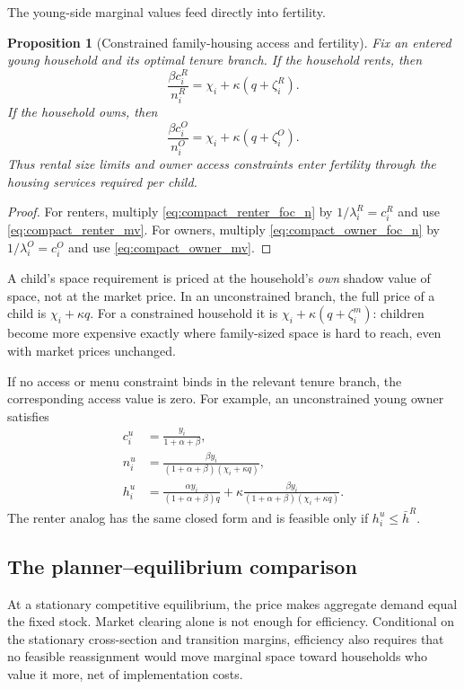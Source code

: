 \documentclass[11pt]{article}
\newtheorem{proposition}{Proposition}
\newcommand{\1}{\mathbf 1}
\begin{document}
The young-side marginal values feed directly into fertility.

\begin{proposition}[Constrained family-housing access and fertility]
Fix an entered young household and its optimal tenure branch. If the household rents, then
\[
\frac{\beta c_i^R}{n_i^R}
=
\chi_i+\kappa(q+\zeta_i^R).
\]
If the household owns, then
\[
\frac{\beta c_i^O}{n_i^O}
=
\chi_i+\kappa(q+\zeta_i^O).
\]
Thus rental size limits and owner access constraints enter fertility through the housing services required per child.
\end{proposition}

\begin{proof}
For renters, multiply \eqref{eq:compact_renter_foc_n} by $1/\lambda_i^R=c_i^R$ and use \eqref{eq:compact_renter_mv}. For owners, multiply \eqref{eq:compact_owner_foc_n} by $1/\lambda_i^O=c_i^O$ and use \eqref{eq:compact_owner_mv}.
\end{proof}

A child's space requirement is priced at the household's \emph{own} shadow value of space, not at the market price. In an unconstrained branch, the full price of a child is $\chi_i+\kappa q$. For a constrained household it is $\chi_i+\kappa(q+\zeta_i^m)$: children become more expensive exactly where family-sized space is hard to reach, even with market prices unchanged.

If no access or menu constraint binds in the relevant tenure branch, the corresponding access value is zero. For example, an unconstrained young owner satisfies
\begin{align*}
c_i^u&=\frac{y_i}{1+\alpha+\beta},
\\
n_i^u&=\frac{\beta y_i}{(1+\alpha+\beta)(\chi_i+\kappa q)},
\\
h_i^u&=\frac{\alpha y_i}{(1+\alpha+\beta)q}
+
\kappa\frac{\beta y_i}{(1+\alpha+\beta)(\chi_i+\kappa q)}.
\end{align*}
The renter analog has the same closed form and is feasible only if $h_i^u\le\bar h^R$.

\subsection{The planner--equilibrium comparison}

At a stationary competitive equilibrium, the price makes aggregate demand equal the fixed stock. Market clearing alone is not enough for efficiency. Conditional on the stationary cross-section and transition margins, efficiency also requires that no feasible reassignment would move marginal space toward households who value it more, net of implementation costs.
\end{document}

